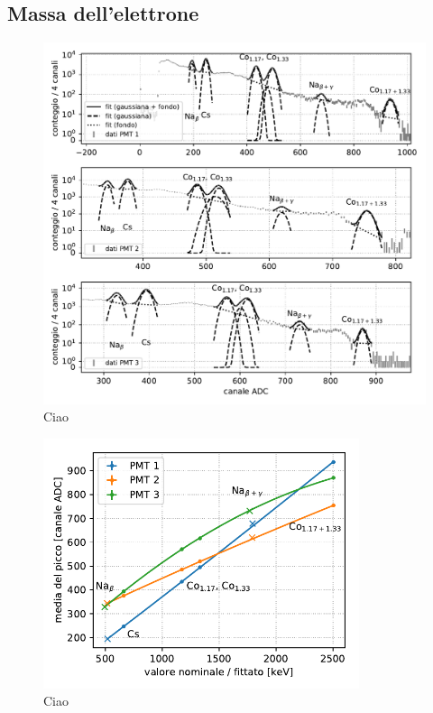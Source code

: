 \subsection{Massa dell'elettrone}

\begin{figure}
	\includegraphics[width=\textwidth]{immagini/mass18-peaks}
	\caption{\label{fig:mass18-peaks}
	Ciao}
\end{figure}

\begin{figure}
	\centering
	\includegraphics[width=25em]{immagini/mass18-cal}
	\caption{\label{fig:mass18-cal}
	Ciao}
\end{figure}
